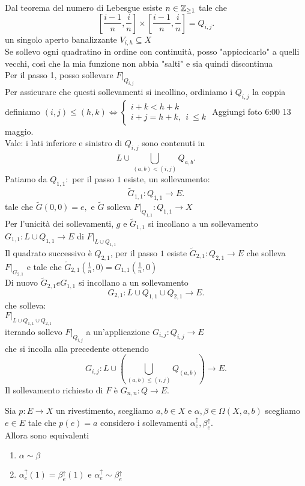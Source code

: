 \documentclass[12px]{article}
\begin{document}
\begin{dimo}
 Dal teorema del numero di Lebesgue esiste  $n\in \mathbb{Z}_{\geq 1}$ tale che \\
  \[
	  \left[\frac{i-1}n,\frac in\right]\times\left[\frac{i-1}n,\frac in\right] = Q_{i,j}
 .\]
 un singolo aperto banalizzante $V_{i,h}\subseteq X$\\
 Se sollevo ogni quadratino in ordine con continuità, posso "appiccicarlo" a quelli vecchi, così che la mia funzione non abbia "salti" e sia quindi discontinua \\
 Per il passo 1, posso sollevare $F|_{Q_{i,j}}$\\
 Per  assicurare che questi sollevamenti si incollino, ordiniamo i $Q_{i,j}$ la coppia definiamo $(i,j) \leq (h,k) \Leftrightarrow \begin{cases}
 	i + k < h+ k \ \\
	i + j = h + k, \ \ i\ \leq k
 \end{cases}$
 Aggiungi foto 6:00 13 maggio.\\
 Vale: i lati inferiore e sinistro di $Q_{i,j}$ sono contenuti in 
  \[
	  L\cup \bigcup^{}_{(a,b) < (i,j)} Q_{a,b}
 .\]
 Patiamo da $Q_{1,1}:$ per il passo $1$ esiste, un sollevamento:
  \[
	  \tilde G_{1,1}: Q_{1,1} \rightarrow E
 .\] 
 tale che $\tilde G (0,0) = e, $ e  $\tilde G$ solleva  $F|_{Q_{1,1}}: Q_{1,1} \rightarrow X$ \\
 Per l'unicità dei sollevamenti, $g$ e  $\tilde G_{1,1}$ si incollano a un sollevamento\\  $G_{1,1}:L\cup Q_{1,1} \rightarrow E$ di $F|_{L\cup Q_{1,1}}$\\
 Il quadrato successivo è  $Q_{2,1}$, per il passo  $1$ esiste $\tilde G_{2,1}: Q_{2,1} \rightarrow E$ che solleva $F|_{G_{2,1}}$ e tale che  $\tilde G_{2,1} \left(\frac 1n, 0) = G_{1,1}(\frac 1n, 0)$\\
	 Di nuovo $\tilde G_{2,1} e G_{1,1}$ si incollano a un sollevamento \\
	  \[
		  G_{2,1}: L \cup Q_{1,1} \cup Q_{2,1} \rightarrow E
	 .\] 
	 che solleva:\\
	 $F|_{L\cup Q_{1,1}\cup Q_{2,1}}$\\
	 iterando sollevo $F|_{Q_{i,j}}$ a un'applicazione  $G_{i,j} : Q_{i,j} \rightarrow E$\\
	 che si incolla alla precedente ottenendo
	 \[
		 G_{i,j}: L\cup \left( \bigcup^{}_{(a,b) \leq (i,j)}Q_{(a,b)} \right) \rightarrow E
	 .\] 
	 Il sollevamento richiesto di $F$ è $G_{n,n} : Q \rightarrow E.$
\end{dimo}
\begin{teo}
	Sia $p : E \rightarrow X$ un rivestimento, scegliamo $a,b\in X$ e $\alpha,\beta\in \Omega(X,a,b)$ scegliamo  $e\in E$ tale che  $p(e) = a$ considero i sollevamenti  $\alpha^\uparrow_e, \beta^\uparrow_e$.\\
	Allora sono equivalenti
	 \begin{enumerate}
		 \item $\alpha \sim \beta$
		 \item  $\alpha^\uparrow_e(1) = \beta^\uparrow_e (1)$ e  $\alpha^\uparrow_e\sim\beta^\uparrow_e$
	\end{enumerate}
\end{teo}
\end{document}
